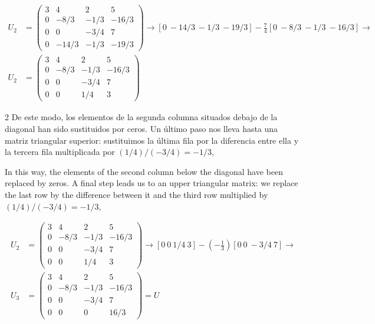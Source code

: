 \begin{align*}
U_2 &=\begin{pmatrix}
3& 4& 2&5\\
0& -8/3& -1/3& -16/3\\
0& 0& -3/4& 7\\
0& -14/3& -1/3& -19/3
\end{pmatrix} \rightarrow [0\ -14/3\ -1/3\ -19/3]-\frac{7}{4} [0\ -8/3\ -1/3\ -16/3] \rightarrow \\
 U_2 &=\begin{pmatrix}
3& 4& 2&5\\
0& -8/3& -1/3& -16/3\\
0& 0& -3/4& 7\\
0& 0& 1/4& 3
\end{pmatrix}
\end{align*}

\begin{paracol}{2}
De este modo, los elementos de la segunda columna situados debajo de la diagonal han sido sustituidos por ceros. Un último paso nos lleva hasta una matriz triangular superior: sustituimos la última fila por la diferencia entre ella y la tercera fila multiplicada por $(1/4)/(-3/4)=-1/3$,

\switchcolumn
In this way, the elements of the second column below the diagonal have been replaced by zeros. A final step leads us to an upper triangular matrix: we replace the last row by the difference between it and the third row multiplied by $(1/4)/(-3/4)=-1/3$,
\end{paracol}

\begin{align*}
 U_2 &=\begin{pmatrix}
3& 4& 2&5\\
0& -8/3& -1/3& -16/3\\
0& 0& -3/4& 7\\
0& 0& 1/4& 3
\end{pmatrix} \rightarrow [0\ 0\ 1/4\ 3]-\left(-\frac{1}{3}\right) [0\ 0\ -3/4\ 7] \rightarrow \\
 U_3 &=\begin{pmatrix}
3& 4& 2&5\\
0& -8/3& -1/3& -16/3\\
0& 0& -3/4& 7\\
0& 0& 0& 16/3
\end{pmatrix}=U
\end{align*}

